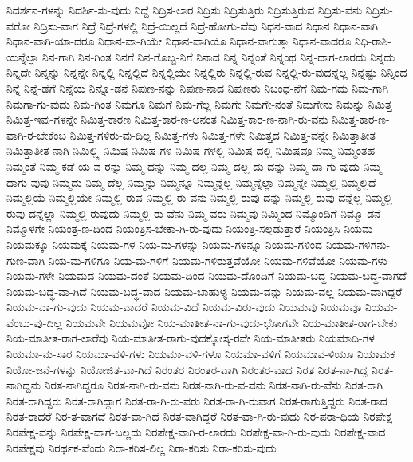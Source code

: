 {ನಿದರ್ಶನ-ಗಳನ್ನು
ನಿದರ್ಶಿ-ಸು-ವುದು
ನಿದ್ದೆ
ನಿದ್ರಿಸ-ಲಾರ
ನಿದ್ರಿಸು
ನಿದ್ರಿಸುತ್ತಿರು
ನಿದ್ರಿಸುತ್ತಿರುವ
ನಿದ್ರಿಸು-ವನು
ನಿದ್ರಿಸು-ವರೋ
ನಿದ್ರಿಸು-ವಾಗ
ನಿದ್ರೆ
ನಿದ್ರೆ-ಗಳಲ್ಲಿ
ನಿದ್ರೆ-ಯಿಲ್ಲದೆ
ನಿದ್ರೆ-ಹೋಗು-ವೆವು
ನಿಧನ-ವಾದ
ನಿಧಾನ
ನಿಧಾನ-ವಾಗಿ
ನಿಧಾನ-ವಾಗಿ-ಯಾ-ದರೂ
ನಿಧಾನ-ವಾ-ಗಿಯೇ
ನಿಧಾನ-ವಾಗಿಯೊ
ನಿಧಾನ-ವಾಗುತ್ತಾ
ನಿಧಾನ-ವಾದರೂ
ನಿಧಿ-ರಾಶಿ-ಯನ್ನೆಲ್ಲಾ
ನಿನ-ಗಾಗಿ
ನಿನ-ಗಿಂತ
ನಿನಗೆ
ನಿನ-ಗೊಬ್ಬ-ನಿಗೆ
ನಿನಾದ
ನಿನ್ನ
ನಿನ್ನಂತೆ
ನಿನ್ನಂಥ
ನಿನ್ನ-ದಾಗ-ಲಾರದು
ನಿನ್ನದು
ನಿನ್ನದೇ
ನಿನ್ನನ್ನು
ನಿನ್ನನ್ನೇ
ನಿನ್ನಲ್ಲಿ
ನಿನ್ನಲ್ಲಿದೆ
ನಿನ್ನಲ್ಲಿಯೇ
ನಿನ್ನಲ್ಲಿರು
ನಿನ್ನಲ್ಲಿ-ರುವ
ನಿನ್ನಲ್ಲಿ-ರು-ವುದನ್ನೆಲ್ಲ
ನಿನ್ನಷ್ಟು
ನಿನ್ನಿಂದ
ನಿನ್ನೆ
ನಿನ್ನೆ-ಡೆಗೆ
ನಿನ್ನೆಯ
ನಿನ್ನೊ-ಡನೆ
ನಿಪುಣ-ನನ್ನು
ನಿಪುಣ-ನಾದ
ನಿಪುಣರು
ನಿಬಂಧ-ನೆಗೆ
ನಿಮ-ಗದು
ನಿಮ-ಗಾಗಿ
ನಿಮಗಾ-ಗು-ವುದು
ನಿಮ-ಗಿಂತ
ನಿಮಗೂ
ನಿಮಗೆ
ನಿಮ-ಗೆಲ್ಲ
ನಿಮಗೇ
ನಿಮಗೇ-ನಂತೆ
ನಿಮಗೇನು
ನಿಮನ್ನು
ನಿಮಿತ್ತ
ನಿಮಿತ್ತ-ಇವು-ಗಳನ್ನೇ
ನಿಮಿತ್ತ-ಕಾರಣ
ನಿಮಿತ್ತ-ಕಾರ-ಣ-ಅನಂತ
ನಿಮಿತ್ತ-ಕಾರ-ಣ-ನಾಗಿ-ರು-ವನು
ನಿಮಿತ್ತ-ಕಾರ-ಣ-ವಾಗಿ-ರ-ಬೇಕೆಂಬ
ನಿಮಿತ್ತ-ಗಳಿರು-ವು-ದಿಲ್ಲ
ನಿಮಿತ್ತ-ಗಳು
ನಿಮಿತ್ತ-ಗಳೇ
ನಿಮಿತ್ತದ
ನಿಮಿತ್ತ-ವನ್ನೇ
ನಿಮಿತ್ತಾತೀತ
ನಿಮಿತ್ತಾತೀತ-ನಾಗಿ
ನಿಮಿಲ್ಲ್ಲಿ
ನಿಮಿಷ
ನಿಮಿಷ-ಗಳ
ನಿಮಿಷ-ಗಳಲ್ಲಿ
ನಿಮಿಷ-ದಲ್ಲಿ
ನಿಮಿಷವೂ
ನಿಮ್ಮ
ನಿಮ್ಮಂತಹ
ನಿಮ್ಮಂತೆ
ನಿಮ್ಮ-ಕಡೆ-ಯ-ವ-ರನ್ನು
ನಿಮ್ಮ-ದನ್ನು
ನಿಮ್ಮ-ದಲ್ಲ
ನಿಮ್ಮ-ದಲ್ಲ-ದು-ದನ್ನು
ನಿಮ್ಮ-ದಾ-ಗು-ವುದು
ನಿಮ್ಮ-ದಾಗು-ವುವು
ನಿಮ್ಮದು
ನಿಮ್ಮ-ದೆಲ್ಲ
ನಿಮ್ಮನ್ನು
ನಿಮ್ಮನ್ನೂ
ನಿಮ್ಮನ್ನೆಲ್ಲ
ನಿಮ್ಮನ್ನೆಲ್ಲಾ
ನಿಮ್ಮನ್ನೇ
ನಿಮ್ಮಲ್ಲಿ
ನಿಮ್ಮಲ್ಲಿದೆ
ನಿಮ್ಮಲ್ಲಿಯೆ
ನಿಮ್ಮಲ್ಲಿಯೇ
ನಿಮ್ಮಲ್ಲಿ-ರುವ
ನಿಮ್ಮಲ್ಲಿ-ರು-ವನು
ನಿಮ್ಮಲ್ಲಿ-ರುವು-ದನ್ನು
ನಿಮ್ಮಲ್ಲಿ-ರುವು-ದನ್ನೆಲ್ಲ
ನಿಮ್ಮಲ್ಲಿ-ರುವು-ದನ್ನೆಲ್ಲಾ
ನಿಮ್ಮಲ್ಲಿ-ರುವುದು
ನಿಮ್ಮಲ್ಲಿ-ರು-ವೆನು
ನಿಮ್ಮ-ವರು
ನಿಮ್ಮವು
ನಿಮ್ಮಿಂದ
ನಿಮ್ಮೊಂದಿಗೆ
ನಿಮ್ಮೊ-ಡನೆ
ನಿಮ್ಮೊಳಗೇ
ನಿಯಂತ್ರ-ಣ-ದಿಂದ
ನಿಯಂತ್ರಿಸ-ಬೇಕಾ-ಗಿ-ರು-ವುದು
ನಿಯಂತ್ರಿ-ಸಲ್ಪಡುತ್ತಾರೆ
ನಿಯಂತ್ರಿಸಿ
ನಿಯಮ
ನಿಯಮಕ್ಕೂ
ನಿಯಮಕ್ಕೆ
ನಿಯಮ-ಗಳ
ನಿಯ-ಮ-ಗಳನ್ನು
ನಿಯಮ-ಗಳನ್ನೂ
ನಿಯಮ-ಗಳಿಂದ
ನಿಯಮ-ಗಳಿಗನು-ಗುಣ-ವಾಗಿ
ನಿಯ-ಮ-ಗಳಿಗೂ
ನಿಯ-ಮ-ಗಳಿಗೆ
ನಿಯಮ-ಗಳಿರುತ್ತವೆಯೋ
ನಿಯಮ-ಗಳಿವೆಯೋ
ನಿಯಮ-ಗಳು
ನಿಯಮ-ಗಳೇ
ನಿಯಮದ
ನಿಯಮ-ದಂತೆ
ನಿಯಮ-ದಿಂದ
ನಿಯಮ-ದೊಂದಿಗೆ
ನಿಯಮ-ಬದ್ಧ
ನಿಯಮ-ಬದ್ಧ-ವಾಗದೆ
ನಿಯಮ-ಬದ್ಧ-ವಾ-ಗಿದೆ
ನಿಯಮ-ಬದ್ಧ-ವಾದ
ನಿಯಮ-ಬಾಹುಳ್ಯ
ನಿಯಮ-ವನ್ನು
ನಿಯಮ-ವಲ್ಲ
ನಿಯಮ-ವಾಗಿದ್ದರೆ
ನಿಯಮ-ವಾ-ಗು-ವುದು
ನಿಯಮ-ವಾದರೆ
ನಿಯಮ-ವಿದೆ
ನಿಯಮ-ವಿರು-ವುದು
ನಿಯಮವು
ನಿಯಮವೂ
ನಿಯಮ-ವೆಂಬು-ವು-ದಿಲ್ಲ
ನಿಯಮವೇ
ನಿಯಮವೋ
ನಿಯ-ಮಾತೀತ-ನಾ-ಗು-ವುದು-ಭೋಗವೇ
ನಿಯ-ಮಾತೀತ-ರಾಗ-ಬೇಕು
ನಿಯ-ಮಾತೀತ-ರಾಗ-ಲಾರೆವು
ನಿಯ-ಮಾತೀತ-ರಾಗು-ವುದಕ್ಕೋಸ್ಕ-ರವೇ
ನಿಯ-ಮಾತೀತರು
ನಿಯಮಾದಿ-ಗಳ
ನಿಯಮಾ-ನು-ಸಾರ
ನಿಯಮಾ-ವಳಿ-ಗಳು
ನಿಯಮಾ-ವಳಿ-ಗಳೂ
ನಿಯಮಾ-ವಳಿಗೆ
ನಿಯಮಾವ-ಳಿಯೂ
ನಿಯಾಮಕ
ನಿಯೋ-ಜನೆ-ಗಳನ್ನು
ನಿಯೋಜಿತ-ವಾ-ಗಿದೆ
ನಿರಂತರ
ನಿರಂತರ-ವಾಗಿ
ನಿರಂತರ-ವಾದ
ನಿರತ
ನಿರತ-ನಾ-ಗಿದ್ದ
ನಿರತ-ನಾಗಿದ್ದನು
ನಿರತ-ನಾಗಿದ್ದರೂ
ನಿರತ-ನಾಗಿ-ರು-ವನು
ನಿರತ-ನಾಗಿ-ರು-ವ-ವನು
ನಿರತ-ನಾಗಿ-ರು-ವೆನು
ನಿರತ-ರಾಗಿ
ನಿರತ-ರಾಗಿದ್ದರು
ನಿರತ-ರಾಗಿದ್ದಾಗ
ನಿರತ-ರಾ-ಗಿ-ರು-ವರು
ನಿರತ-ರಾ-ಗಿ-ರುವಾಗ
ನಿರತ-ರಾಗುತ್ತಿದ್ದರು
ನಿರತ-ರಾದ
ನಿರತ-ರಾದರೆ
ನಿರ-ತ-ವಾಗದೆ
ನಿರತ-ವಾ-ಗಿದೆ
ನಿರತ-ವಾಗಿದ್ದರೆ
ನಿರತ-ವಾ-ಗಿ-ರು-ವುದು
ನಿರ-ಪರಾ-ಧಿಯ
ನಿರಪೇಕ್ಷ
ನಿರಪೇಕ್ಷ-ವನ್ನು
ನಿರಪೇಕ್ಷ-ವಾಗ-ಬಲ್ಲದು
ನಿರಪೇಕ್ಷ-ವಾಗಿ-ರ-ಲಾರದು
ನಿರಪೇಕ್ಷ-ವಾ-ಗಿ-ರು-ವುದು
ನಿರಪೇಕ್ಷ-ವಾದ
ನಿರಪೇಕ್ಷವು
ನಿರರ್ಥಕ-ವೆಂದು
ನಿರಾ-ಕರಿಸ-ಲಿಲ್ಲ
ನಿರಾ-ಕರಿಸು
ನಿರಾ-ಕರಿಸು-ವುದು
}
